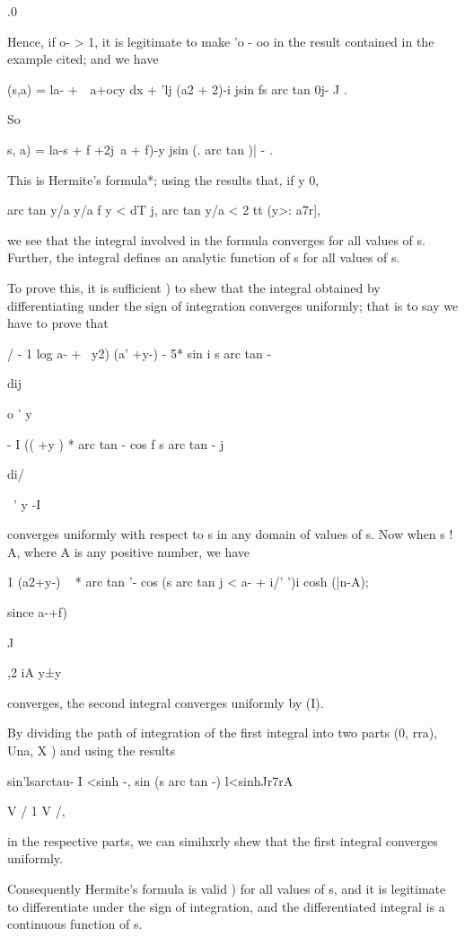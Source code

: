 .0

Hence, if o- > 1, it is legitimate to make 'o - oo in the result
contained in the example cited; and we have

 (s,a) = la- +\ \ a+ocy dx + 'lj (a2 + 2)-i jsin fs arc tan 0j- J .

So

  s, a) = la-s + f +2j\ a + f)-y jsin (. arc tan )| - .

This is Hermite's formula*; using the results that, if y 0,

arc tan y/a y/a f y < dT j, arc tan y/a < 2 tt (y>: a7r],

we see that the integral involved in the formula converges for all
values of s. Further, the integral defines an analytic function of s
for all values of s.

To prove this, it is sufficient ) to shew that the integral
obtained by differentiating under the sign of integration converges
uniformly; that is to say we have to prove that

/ - 1 log a- + \ y2) (a' +y-) - 5* sin i s arc tan -

dij

o ' y

- I (( +y ) * arc tan - cos f s arc tan - j

di/

~' y -I

converges uniformly with respect to s in any domain of values of s.
Now when s ! A, where A is any positive number, we have

1 (a2+y-) ~ * arc tan '- cos (s arc tan j < a- + i/' ')i cosh (|n-A);

since a-+f)

  J

,2 iA y±y\

converges, the second integral converges uniformly by  (I).

By dividing the path of integration of the first integral into two
parts (0, rra), Una, X ) and using the results

sin'lsarctau- I <sinh -, sin (s arc tan -) l<sinhJr7rA

V / 1 V /,

in the respective parts, we can simihxrly shew that the first integral
converges uniformly.

Consequently Hermite's formula is valid ) for all values of s,
and it is legitimate to differentiate under the sign of integration,
and the differentiated integral is a continuous function of s.

